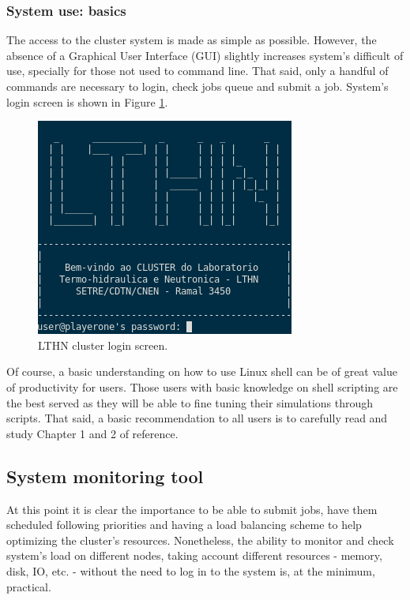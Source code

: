 \documentclass[twoside,a4paper,12pt,english]{inac19}
\begin{document}
\subsubsection{System use: basics}
The access to the cluster system is made as simple as possible. However, the absence of a Graphical User Interface
(GUI) slightly increases system's difficult of use, specially for those not used to command line. That said, only
a handful of commands are necessary to login, check jobs queue and submit a job. System's login screen is shown
in Figure \ref{fig:login-screen}.

\begin{figure}[h] %
  \centering\includegraphics[scale=0.7]{images/p1login.png}
  \caption{LTHN cluster login screen.}
  \label{fig:login-screen}
\end{figure}

Of course, a basic understanding on how to use Linux shell can be of great value of productivity for users.
Those users with basic knowledge on shell scripting are the best served as they will be able to fine tuning
their simulations through scripts. That said, a basic recommendation to all users is to carefully read and
study Chapter 1 and 2 of reference\cite{ECP}.

\subsection{System monitoring tool}
\label{ssec:ganglia}

At this point it is clear the importance to be able to submit jobs, have them scheduled following priorities
and having a load balancing scheme to help optimizing the cluster's resources. Nonetheless, the ability to
monitor and check system's load on different nodes, taking account different resources - memory, disk, IO,
etc. - without the need to log in to the system is, at the minimum, practical.
\end{document}

